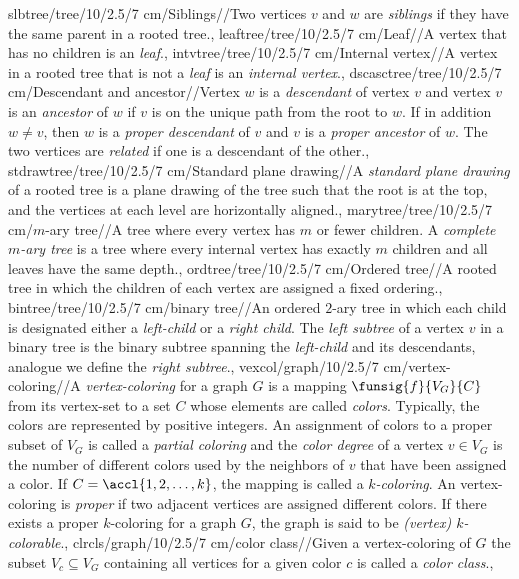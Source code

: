 slbtree/tree/10/2.5/7 cm/{Siblings}/{}/{Two vertices $v$ and $w$ are \emph{siblings} if they have the same parent in a rooted tree.},
leaftree/tree/10/2.5/7 cm/{Leaf}/{}/{A vertex that has no children is an \emph{leaf}.},
intvtree/tree/10/2.5/7 cm/{Internal vertex}/{}/{A vertex in a rooted tree that is not a \emph{leaf} is an \emph{internal vertex}.},
dscasctree/tree/10/2.5/7 cm/{Descendant and ancestor}/{}/{Vertex $w$ is a \emph{descendant} of vertex $v$ and vertex $v$ is an \emph{ancestor} of $w$ if $v$ is on the unique path from the root to $w$. If in addition $w\neq v$, then $w$ is a \emph{proper descendant} of $v$ and $v$ is a \emph{proper ancestor} of $w$. The two vertices are \emph{related} if one is a descendant of the other.},
stdrawtree/tree/10/2.5/7 cm/{Standard plane drawing}/{}/{A \emph{standard plane drawing} of a rooted tree is a plane drawing of the tree such that the root is at the top, and the vertices at each level are horizontally aligned.},
marytree/tree/10/2.5/7 cm/{$m$-ary tree}/{}/{A tree where every vertex has $m$ or fewer children. A \emph{complete $m$-ary tree} is a tree where every internal vertex has exactly $m$ children and all leaves have the same depth.},
ordtree/tree/10/2.5/7 cm/{Ordered tree}/{}/{A rooted tree in which the children of each vertex are assigned a fixed ordering.},
bintree/tree/10/2.5/7 cm/{binary tree}/{}/{An ordered $2$-ary tree in which each child is designated either a \emph{left-child} or a \emph{right child}. The \emph{left subtree} of a vertex $v$ in a binary tree is the binary subtree spanning the \emph{left-child} and its descendants, analogue we define the \emph{right subtree}.},
vexcol/graph/10/2.5/7 cm/{vertex-coloring}/{}/{A \emph{vertex-coloring} for a graph $G$ is a mapping $\funsig{f}{V_G}{C}$ from its vertex-set to a set $C$ whose elements are called \emph{colors}. Typically, the colors are represented by positive integers. An assignment of colors to a proper subset of $V_G$ is called a \emph{partial coloring} and the \emph{color degree} of a vertex $v\in V_G$ is the number of different colors used by the neighbors of $v$ that have been assigned a color. If $C=\accl{1,2,\ldots,k}$, the mapping is called a \emph{$k$-coloring}. An vertex-coloring is \emph{proper} if two adjacent vertices are assigned different colors. If there exists a proper $k$-coloring for a graph $G$, the graph is said to be \emph{(vertex) $k$-colorable}.},
clrcls/graph/10/2.5/7 cm/{color class}/{}/{Given a vertex-coloring of $G$ the subset $V_c\subseteq V_G$ containing all vertices for a given color $c$ is called a \emph{color class}.},
